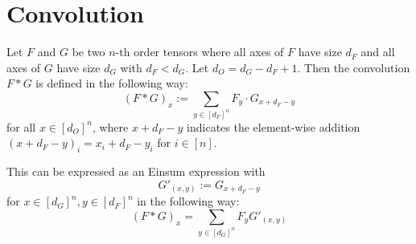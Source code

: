 \section{Convolution}

Let $F$ and $G$ be two $n$-th order tensors where all axes of $F$ have size $d_F$ and all axes of $G$ have size $d_G$ with $d_F < d_G$.
Let $d_O = d_G - d_F + 1$.
Then the convolution $F * G$ is defined in the following way:
$$(F * G)_x := \sum\limits_{y \in [d_F]^n} F_y \cdot G_{x + d_F - y}$$
for all $x \in [d_O]^n$, where $x + d_F - y$ indicates the element-wise addition $(x + d_F - y)_i = x_i + d_F - y_i$ for $i \in [n]$.

This can be expressed as an Einsum expression with
$$G'_{(x, y)} := G_{x + d_F - y}$$
for $x \in [d_G]^n, y \in [d_F]^n$ in the following way:
$$(F * G)_x = \sum\limits_{y \in [d_G]^n} F_y G'_{(x, y)}$$